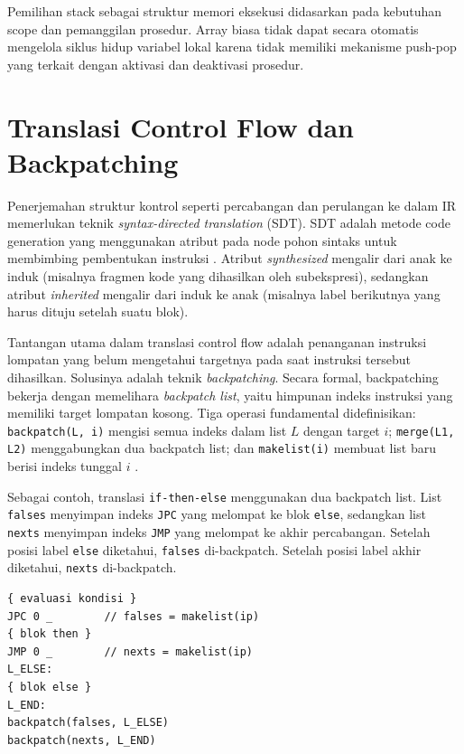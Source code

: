 Pemilihan stack sebagai struktur memori eksekusi didasarkan pada kebutuhan scope dan pemanggilan prosedur. Array biasa tidak dapat secara otomatis mengelola siklus hidup variabel lokal karena tidak memiliki mekanisme push-pop yang terkait dengan aktivasi dan deaktivasi prosedur.


\section{Translasi Control Flow dan Backpatching}

Penerjemahan struktur kontrol seperti percabangan dan perulangan ke dalam IR memerlukan teknik \textit{syntax-directed translation} (SDT). SDT adalah metode code generation yang menggunakan atribut pada node pohon sintaks untuk membimbing pembentukan instruksi \cite{aho2007compilers}. Atribut \textit{synthesized} mengalir dari anak ke induk (misalnya fragmen kode yang dihasilkan oleh subekspresi), sedangkan atribut \textit{inherited} mengalir dari induk ke anak (misalnya label berikutnya yang harus dituju setelah suatu blok).

Tantangan utama dalam translasi control flow adalah penanganan instruksi lompatan yang belum mengetahui targetnya pada saat instruksi tersebut dihasilkan. Solusinya adalah teknik \textit{backpatching}. Secara formal, backpatching bekerja dengan memelihara \textit{backpatch list}, yaitu himpunan indeks instruksi yang memiliki target lompatan kosong. Tiga operasi fundamental didefinisikan: \texttt{backpatch(L, i)} mengisi semua indeks dalam list $L$ dengan target $i$; \texttt{merge(L1, L2)} menggabungkan dua backpatch list; dan \texttt{makelist(i)} membuat list baru berisi indeks tunggal $i$ \cite{aho2007compilers}.

Sebagai contoh, translasi \texttt{if-then-else} menggunakan dua backpatch list. List \texttt{falses} menyimpan indeks \texttt{JPC} yang melompat ke blok \texttt{else}, sedangkan list \texttt{nexts} menyimpan indeks \texttt{JMP} yang melompat ke akhir percabangan. Setelah posisi label \texttt{else} diketahui, \texttt{falses} di-backpatch. Setelah posisi label akhir diketahui, \texttt{nexts} di-backpatch.

\begin{tcolorbox}[title=Contoh TAC untuk IF-ELSE dengan Backpatching,colback=gray!5,colframe=black!60,boxrule=0.5pt,arc=2mm]
\begin{verbatim}
{ evaluasi kondisi }
JPC 0 _        // falses = makelist(ip)
{ blok then }
JMP 0 _        // nexts = makelist(ip)
L_ELSE:
{ blok else }
L_END:
backpatch(falses, L_ELSE)
backpatch(nexts, L_END)
\end{verbatim}
\end{tcolorbox}


